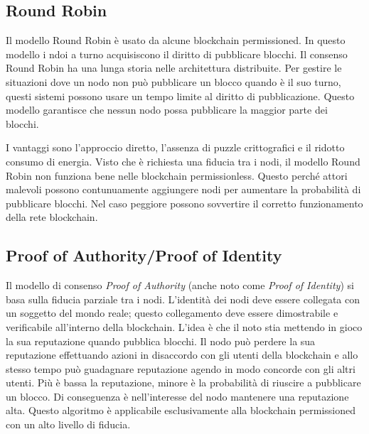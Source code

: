 \subsection{Round Robin}
Il modello Round Robin è usato da alcune blockchain permissioned.
In questo modello i ndoi a turno acquisiscono il diritto di pubblicare blocchi. Il consenso
Round Robin ha una lunga storia nelle architettura distribuite. Per gestire le situazioni
dove un nodo non può pubblicare un blocco quando è il suo turno, questi sistemi possono
usare un tempo limite al diritto di pubblicazione. Questo modello garantisce che nessun nodo possa
pubblicare la maggior parte dei blocchi.

I vantaggi sono l'approccio diretto, l'assenza di puzzle crittografici e il ridotto consumo di energia.
Visto che è richiesta una fiducia tra i nodi, il modello Round Robin non funziona bene
nelle blockchain permissionless. Questo perché attori malevoli possono contunuamente aggiungere
nodi per aumentare la probabilità di pubblicare blocchi. Nel caso peggiore possono
sovvertire il corretto funzionamento della rete blockchain.

\subsection{Proof of Authority/Proof of Identity}
Il modello di consenso \textit{Proof of Authority} (anche noto come \textit{Proof of Identity})
si basa sulla fiducia parziale tra i nodi.
L'identità dei nodi deve essere collegata con un soggetto del mondo reale; questo collegamento deve essere
dimostrabile e verificabile all'interno della blockchain.
L'idea è che il noto stia mettendo in gioco la sua reputazione quando pubblica blocchi.
Il nodo può perdere la sua reputazione effettuando azioni in disaccordo con gli utenti della blockchain
e allo stesso tempo può guadagnare reputazione agendo in modo concorde con gli altri utenti.
Più è bassa la reputazione, minore è la probabilità di riuscire a pubblicare un blocco.
Di conseguenza è nell'interesse del nodo mantenere una reputazione alta. Questo algoritmo
è applicabile esclusivamente alla blockchain permissioned con un alto livello di fiducia.

